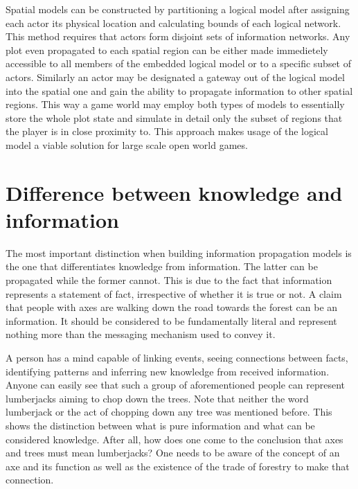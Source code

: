 Spatial models can be constructed by partitioning a logical model after assigning each actor its physical location and calculating bounds of each logical network.
This method requires that actors form disjoint sets of information networks.
Any plot even propagated to each spatial region can be either made immedietely accessible to all members of the embedded logical model or to a specific subset of actors.
Similarly an actor may be designated a gateway out of the logical model into the spatial one and gain the ability to propagate information to other spatial regions.
This way a game world may employ both types of models to essentially store the whole plot state and simulate in detail only the subset of regions that the player is in close proximity to.
This approach makes usage of the logical model a viable solution for large scale open world games.

\section{Difference between knowledge and information}

The most important distinction when building information propagation models is the one that differentiates knowledge from information.
The latter can be propagated while the former cannot.
This is due to the fact that information represents a statement of fact, irrespective of whether it is true or not.
A claim that people with axes are walking down the road towards the forest can be an information.
It should be considered to be fundamentally literal and represent nothing more than the messaging mechanism used to convey it.

A person has a mind capable of linking events, seeing connections between facts, identifying patterns and inferring new knowledge from received information.
Anyone can easily see that such a group of aforementioned people can represent lumberjacks aiming to chop down the trees.
Note that neither the word lumberjack or the act of chopping down any tree was mentioned before.
This shows the distinction between what is pure information and what can be considered knowledge.
After all, how does one come to the conclusion that axes and trees must mean lumberjacks?
One needs to be aware of the concept of an axe and its function as well as the existence of the trade of forestry to make that connection.

